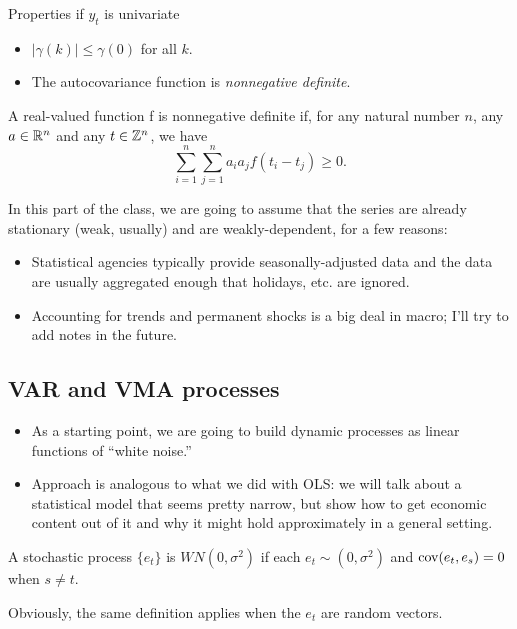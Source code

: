   Properties if $y_t$ is univariate
  \begin{itemize}
  \item $|\gamma(k)| \leq \gamma(0)$ for all $k$.
  \item The autocovariance function is \emph{nonnegative definite}.
  \end{itemize}

  \begin{defn}
    A real-valued function f is nonnegative definite if, for any
    natural number $n$, any $a \in \mathbb{R}^n$ and any $t \in \mathbb{Z}^n$, we have
    \begin{equation*}
      \sum_{i=1}^n \sum_{j=1}^n a_i a_j f(t_i - t_j) \geq 0.
    \end{equation*}
  \end{defn}
In this part of the class, we are going to assume that the series are
already stationary (weak, usually) and are weakly-dependent, for a few reasons:
\begin{itemize}
\item Statistical agencies typically provide seasonally-adjusted data
  and the data are usually aggregated enough that holidays, etc. are
  ignored.
\item Accounting for trends and permanent shocks is a big deal in
  macro; I'll try to add notes in the future.
\end{itemize}

\subsection{VAR and VMA processes}

\begin{itemize}
\item As a starting point, we are going to build dynamic processes as
  linear functions of ``white noise.''
\item Approach is analogous to what we did with OLS: we will talk
  about a statistical model that seems pretty narrow, but show how to
  get economic content out of it and why it might hold approximately
  in a general setting.
\end{itemize}

\begin{defn}
  A stochastic process $\{e_t\}$ is $WN(0, \sigma^2)$ if each
  $e_t ∼ (0, \sigma^2)$ and $\operatorname{cov}(e_t, e_s) = 0$ when $s \neq t$.
\end{defn}

Obviously, the same definition applies when the $e_t$ are random
vectors.

